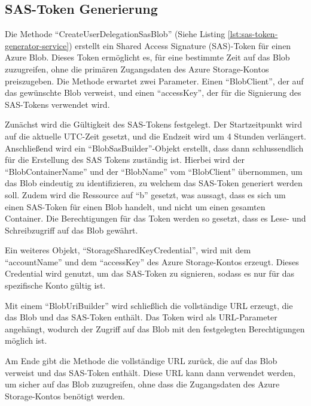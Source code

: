 \subsection{SAS-Token Generierung}

Die Methode ``CreateUserDelegationSasBlob'' (Siehe Listing \ref{lst:sas-token-generator-service}) 
erstellt ein Shared Access Signature (SAS)-Token für einen Azure Blob. Dieses Token ermöglicht 
es, für eine bestimmte Zeit auf das Blob zuzugreifen, ohne die primären Zugangsdaten des 
Azure Storage-Kontos preiszugeben. Die Methode erwartet zwei Parameter. Einen ``BlobClient'', 
der auf das gewünschte Blob verweist, und einen ``accessKey'', der für die Signierung des 
SAS-Tokens verwendet wird.

Zunächst wird die Gültigkeit des SAS-Tokens festgelegt. Der Startzeitpunkt wird auf die 
aktuelle UTC-Zeit gesetzt, und die Endzeit wird um 4 Stunden verlängert. Anschließend wird 
ein ``BlobSasBuilder''-Objekt erstellt, dass dann schlussendlich für die Erstellung des
SAS Tokens zuständig ist. Hierbei wird der ``BlobContainerName'' und der ``BlobName'' 
vom ``BlobClient'' übernommen, um das Blob eindeutig zu identifizieren, zu welchem das 
SAS-Token generiert werden soll. Zudem wird die Ressource auf ``b'' gesetzt, was aussagt, 
dass es sich um einen SAS-Token für einen Blob handelt, und nicht um einen gesamten Container. 
Die Berechtigungen für das Token werden so gesetzt, dass es Lese- und Schreibzugriff 
auf das Blob gewährt.

Ein weiteres Objekt, ``StorageSharedKeyCredential'', wird mit dem ``accountName'' und dem 
``accessKey'' des Azure Storage-Kontos erzeugt. Dieses Credential wird genutzt, um das 
SAS-Token zu signieren, sodass es nur für das spezifische Konto gültig ist.

Mit einem ``BlobUriBuilder'' wird schließlich die vollständige URL erzeugt, die das Blob 
und das SAS-Token enthält. Das Token wird als URL-Parameter angehängt, wodurch der Zugriff 
auf das Blob mit den festgelegten Berechtigungen möglich ist.

Am Ende gibt die Methode die vollständige URL zurück, die auf das Blob verweist und das 
SAS-Token enthält. Diese URL kann dann verwendet werden, um sicher auf das Blob zuzugreifen, 
ohne dass die Zugangsdaten des Azure Storage-Kontos benötigt werden.

